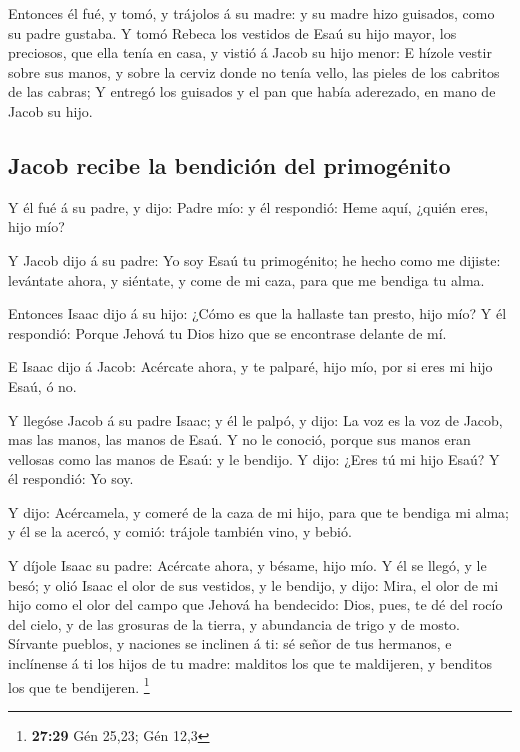  Entonces él fué, y tomó, y trájolos á su madre: y su
madre hizo guisados, como su padre gustaba.  Y tomó
Rebeca los vestidos de Esaú su hijo mayor, los preciosos, que ella tenía
en casa, y vistió á Jacob su hijo menor:  E hízole vestir
sobre sus manos, y sobre la cerviz donde no tenía vello, las pieles de
los cabritos de las cabras;  Y entregó los guisados y el
pan que había aderezado, en mano de Jacob su hijo.

\hypertarget{jacob-recibe-la-bendiciuxf3n-del-primoguxe9nito}{%
\subsection{Jacob recibe la bendición del
primogénito}\label{jacob-recibe-la-bendiciuxf3n-del-primoguxe9nito}}

 Y él fué á su padre, y dijo: Padre mío: y él respondió:
Heme aquí, ¿quién eres, hijo mío?

 Y Jacob dijo á su padre: Yo soy Esaú tu primogénito; he
hecho como me dijiste: levántate ahora, y siéntate, y come de mi caza,
para que me bendiga tu alma.

 Entonces Isaac dijo á su hijo: ¿Cómo es que la hallaste
tan presto, hijo mío? Y él respondió: Porque Jehová tu Dios hizo que se
encontrase delante de mí.

 E Isaac dijo á Jacob: Acércate ahora, y te palparé, hijo
mío, por si eres mi hijo Esaú, ó no.

 Y llegóse Jacob á su padre Isaac; y él le palpó, y dijo:
La voz es la voz de Jacob, mas las manos, las manos de Esaú.
 Y no le conoció, porque sus manos eran vellosas como las
manos de Esaú: y le bendijo.  Y dijo: ¿Eres tú mi hijo
Esaú? Y él respondió: Yo soy.

 Y dijo: Acércamela, y comeré de la caza de mi hijo, para
que te bendiga mi alma; y él se la acercó, y comió: trájole también
vino, y bebió.

 Y díjole Isaac su padre: Acércate ahora, y bésame, hijo
mío.  Y él se llegó, y le besó; y olió Isaac el olor de
sus vestidos, y le bendijo, y dijo: Mira, el olor de mi hijo como el
olor del campo que Jehová ha bendecido:  Dios, pues, te
dé del rocío del cielo, y de las grosuras de la tierra, y abundancia de
trigo y de mosto.  Sírvante pueblos, y naciones se
inclinen á ti: sé señor de tus hermanos, e inclínense á ti los hijos de
tu madre: malditos los que te maldijeren, y benditos los que te
bendijeren. \footnote{\textbf{27:29} Gén 25,23; Gén 12,3}

